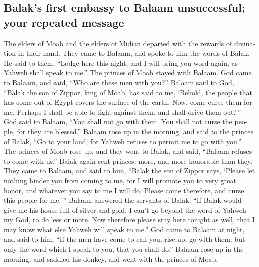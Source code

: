 \begin{paracol}{2}
\begin{otherlanguage}{english}
\hypertarget{balaks-first-embassy-to-balaam-unsuccessful-your-repeated-message}{%
\subsection{Balak's first embassy to Balaam unsuccessful; your repeated
message}\label{balaks-first-embassy-to-balaam-unsuccessful-your-repeated-message}}

 The elders of Moab and the elders of Midian departed with
the rewards of divination in their hand. They came to Balaam, and spoke
to him the words of Balak.  He said to them, ``Lodge here
this night, and I will bring you word again, as Yahweh shall speak to
me.'' The princes of Moab stayed with Balaam.  God came to
Balaam, and said, ``Who are these men with you?''  Balaam
said to God, ``Balak the son of Zippor, king of Moab, has said to me,
 `Behold, the people that has come out of Egypt covers
the surface of the earth. Now, come curse them for me. Perhaps I shall
be able to fight against them, and shall drive them out.'\,''
 God said to Balaam, ``You shall not go with them. You
shall not curse the people, for they are blessed.'' 
Balaam rose up in the morning, and said to the princes of Balak, ``Go to
your land; for Yahweh refuses to permit me to go with you.''
 The princes of Moab rose up, and they went to Balak, and
said, ``Balaam refuses to come with us.''  Balak again
sent princes, more, and more honorable than they.  They
came to Balaam, and said to him, ``Balak the son of Zippor says, `Please
let nothing hinder you from coming to me,  for I will
promote you to very great honor, and whatever you say to me I will do.
Please come therefore, and curse this people for me.'\,''
 Balaam answered the servants of Balak, ``If Balak would
give me his house full of silver and gold, I can't go beyond the word of
Yahweh my God, to do less or more.  Now therefore please
stay here tonight as well, that I may know what else Yahweh will speak
to me.''  God came to Balaam at night, and said to him,
``If the men have come to call you, rise up, go with them; but only the
word which I speak to you, that you shall do.''  Balaam
rose up in the morning, and saddled his donkey, and went with the
princes of Moab.

\hypertarget{balaams-journey-to-moab-and-the-incident-with-the-donkey}{%
}
\end{otherlanguage}
\end{paracol}

